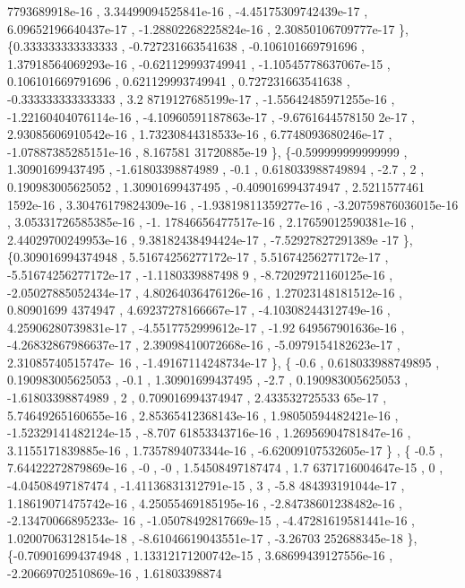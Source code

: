 \begin{DoxyCode}
      7793689918e-16 , 3.34499094525841e-16 , -4.45175309742439e-17 , 6.09652196640437e-17 , -1.28802268225824e-16
       , 2.30850106709777e-17 \},
\{0.333333333333333 , -0.727231663541638 , -0.106101669791696 , 1.37918564069293e-16 , -0.621129993749941 , 
      -1.10545778637067e-15 , 0.106101669791696 , 0.621129993749941 , 0.727231663541638 , -0.333333333333333 , 3.2
      8719127685199e-17 , -1.55642485971255e-16 , -1.22160404076114e-16 , -4.10960591187863e-17 , -9.6761644578150
      2e-17 , 2.93085606910542e-16 , 1.73230844318533e-16 , 6.7748093680246e-17 , -1.07887385285151e-16 , 8.167581
      31720885e-19 \},
\{-0.599999999999999 ,  1.30901699437495 , -1.61803398874989 ,              -0.1 , 0.618033988749894 ,      
              -2.7 ,                 2 , 0.190983005625052 ,  1.30901699437495 , -0.409016994374947 , 2.5211577461
      1592e-16 , 3.30476179824309e-16 , -1.93819811359277e-16 , -3.20759876036015e-16 , 3.05331726585385e-16 , -1.
      17846656477517e-16 , 2.17659012590381e-16 , 2.44029700249953e-16 , 9.38182438494424e-17 , -7.52927827291389e
      -17 \},
\{0.309016994374948 , 5.51674256277172e-17 , 5.51674256277172e-17 , -5.51674256277172e-17 , -1.1180339887498
      9 , -8.72029721160125e-16 , -2.05027885052434e-17 , 4.80264036476126e-16 , 1.27023148181512e-16 , 0.80901699
      4374947 , 4.69237278166667e-17 , -4.10308244312749e-16 , 4.25906280739831e-17 , -4.5517752999612e-17 , -1.92
      649567901636e-16 , -4.26832867986637e-17 , 2.39098410072668e-16 , -5.0979154182623e-17 , 2.31085740515747e-
      16 , -1.49167114248734e-17 \},
\{             -0.6 , 0.618033988749895 , 0.190983005625053 ,              -0.1 ,  1.30901699437495 ,       
             -2.7 , 0.190983005625053 , -1.61803398874989 ,                 2 , 0.709016994374947 , 2.433532725533
      65e-17 , 5.74649265160655e-16 , 2.85365412368143e-16 , 1.98050594482421e-16 , -1.52329141482124e-15 , -8.707
      61853343716e-16 , 1.26956904781847e-16 , 3.1155171839885e-16 , 1.7357894073344e-16 , -6.62009107532605e-17 \}
      ,
\{             -0.5 , 7.64422272879869e-16 ,                -0 ,                -0 ,  1.54508497187474 , 1.7
      6371716004647e-15 ,                 0 , -4.04508497187474 , -1.41136831312791e-15 ,                 3 , -5.8
      484393191044e-17 , 1.18619071475742e-16 , 4.25055469185195e-16 , -2.84738601238482e-16 , -2.13470066895233e-
      16 , -1.05078492817669e-15 , -4.47281619581441e-16 , 1.02007063128154e-18 , -8.61046619043551e-17 , -3.26703
      252688345e-18 \},
\{-0.709016994374948 , 1.13312171200742e-15 , 3.68699439127556e-16 , -2.20669702510869e-16 ,   1.61803398874

\end{DoxyCode}
